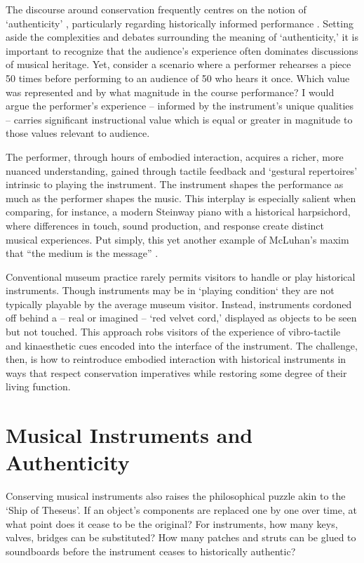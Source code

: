 The discourse around conservation frequently centres on the notion of `authenticity' \cite{pine_museums_2007, laurenson_authenticity_2006}, particularly regarding historically informed performance \cite{davies_authenticity_2001}. Setting aside the complexities and debates surrounding the meaning of `authenticity,' it is important to recognize that the audience's experience often dominates discussions of musical heritage. Yet, consider a scenario where a performer rehearses a piece 50 times before performing to an audience of 50 who hears it once. Which value was represented and by what magnitude in the course performance? I would argue the performer’s experience -- informed by the instrument’s unique qualities -- carries significant instructional value which is equal or greater in magnitude to those values relevant to audience. 

The performer, through hours of embodied interaction, acquires a richer, more nuanced understanding, gained through tactile feedback and `gestural repertoires' \cite[][]{levinson_music_1990} intrinsic to playing the instrument. The instrument shapes the performance as much as the performer shapes the music. This interplay is especially salient when comparing, for instance, a modern Steinway piano with a historical harpsichord, where differences in touch, sound production, and response create distinct musical experiences. Put simply, this yet another example of McLuhan’s maxim that ``the medium is the message'' \cite[][]{mcluhan_understanding_1964}.

Conventional museum practice rarely permits visitors to handle or play historical instruments. Though instruments may be in `playing condition` they are not typically playable by the average museum visitor. Instead, instruments cordoned off behind a -- real or imagined -- `red velvet cord,' \cite{mcalpine_sampling_2014} displayed as objects to be seen but not touched. This approach robs visitors of the experience of vibro-tactile and kinaesthetic cues encoded into the interface of the instrument. The challenge, then, is how to reintroduce embodied interaction with historical instruments in ways that respect conservation imperatives while restoring some degree of their living function.

\section{Musical Instruments and Authenticity}

Conserving musical instruments also raises the philosophical puzzle akin to the `Ship of Theseus'. If an object’s components are replaced one by one over time, at what point does it cease to be the original? For instruments, how many keys, valves, bridges can be substituted? How many patches and struts can be glued to soundboards before the instrument ceases to historically authentic?

